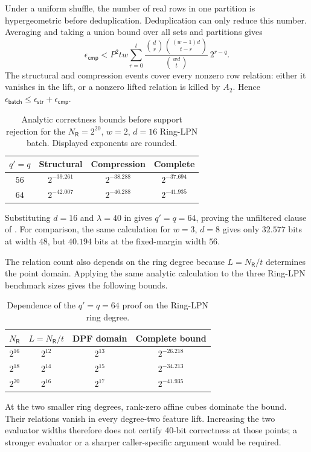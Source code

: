 Under a uniform shuffle, the number of real rows in one partition is
hypergeometric before deduplication.  Deduplication can only reduce this
number.  Averaging and taking a union bound over all sets and partitions gives
\begin{equation}\label{eq:rc-compression-bound}
 \epsilon_{\mathsf{cmp}}
 <P^2tw\sum_{r=0}^{t}
 \frac{\binom dr\binom{(w-1)d}{t-r}}{\binom{wd}{t}}\,2^{r-q}.
\end{equation}
The structural and compression events cover every nonzero row relation:
either it vanishes in the lift, or a nonzero lifted relation is killed by
$A_2$.  Hence
$\epsilon_{\mathsf{batch}}\leq
\epsilon_{\mathsf{str}}+\epsilon_{\mathsf{cmp}}$.

\begin{table}[H]
\centering
\caption{Analytic correctness bounds before support rejection for the
$N_{\mathsf R}=2^{20}$, $w=2$, $d=16$ Ring-LPN batch.
Displayed exponents are rounded.}
\label{tab:rc-hash-complete-bound}
\begin{tabular}{c@{\qquad}c@{\qquad}c@{\qquad}c}
\toprule
$q'=q$ & Structural & Compression & Complete \\
\midrule
$56$ & $2^{-39.261}$ & $2^{-38.288}$ & $2^{-37.694}$ \\
$64$ & $2^{-42.007}$ & $2^{-46.288}$ & $2^{-41.935}$ \\
\bottomrule
\end{tabular}
\end{table}
Substituting $d=16$ and $\lambda=40$ in
 gives $q'=q=64$, proving the unfiltered
clause of .  For comparison, the same
calculation for $w=3$, $d=8$ gives only $32.577$ bits at width $48$, but
$40.194$ bits at the fixed-margin width $56$.

The relation count also depends on the ring degree because
$L=N_{\mathsf R}/t$ determines the point domain.  Applying the same analytic
calculation to the three Ring-LPN benchmark sizes gives the following bounds.
\begin{table}[H]
\centering
\caption{Dependence of the $q'=q=64$ proof on the Ring-LPN ring degree.}
\label{tab:rc-hash-ring-size}
\begin{tabular}{c@{\qquad}c@{\qquad}c@{\qquad}c}
\toprule
$N_{\mathsf R}$ & $L=N_{\mathsf R}/t$ & DPF domain & Complete bound \\
\midrule
$2^{16}$ & $2^{12}$ & $2^{13}$ & $2^{-26.218}$ \\
$2^{18}$ & $2^{14}$ & $2^{15}$ & $2^{-34.213}$ \\
$2^{20}$ & $2^{16}$ & $2^{17}$ & $2^{-41.935}$ \\
\bottomrule
\end{tabular}
\end{table}
At the two smaller ring degrees, rank-zero affine cubes dominate the bound.
Their relations vanish in every degree-two feature lift.  Increasing the two
evaluator widths therefore does not certify 40-bit correctness at those
points; a stronger evaluator or a sharper caller-specific argument would be
required.

